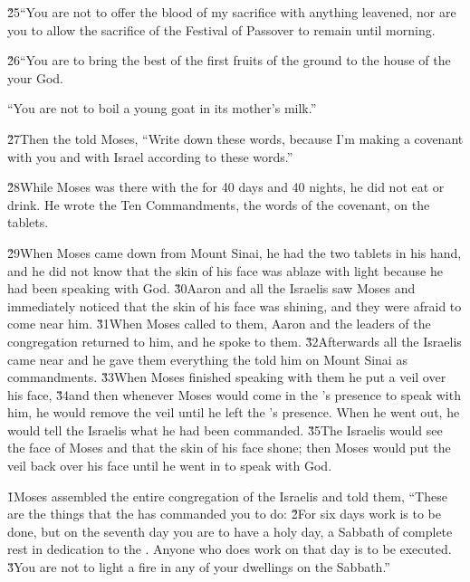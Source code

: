 \v{25}``You are not to offer the blood of my sacrifice with anything leavened, nor are you to allow the sacrifice of the Festival of Passover to remain until morning.

\v{26}``You are to bring the best of the first fruits of the ground to the house of the  your God.

``You are not to boil a young goat in its mother's milk.''

\v{27}Then the  told Moses, ``Write down these words, because I'm making a covenant with you and with Israel according to these words.''

\v{28}While Moses was there with the  for 40 days and 40 nights, he did not eat or drink. He wrote the Ten Commandments, the words of the covenant, on the tablets.

\v{29}When Moses came down from Mount Sinai, he had the two tablets in his hand, and he did not know that the skin of his face was ablaze with light because he had been speaking with God. \v{30}Aaron and all the Israelis saw Moses and immediately noticed that the skin of his face was shining, and they were afraid to come near him. \v{31}When Moses called to them, Aaron and the leaders of the congregation returned to him, and he spoke to them. \v{32}Afterwards all the Israelis came near and he gave them everything the  told him on Mount Sinai as commandments. \v{33}When Moses finished speaking with them he put a veil over his face, \v{34}and then whenever Moses would come in the 's presence to speak with him, he would remove the veil until he left the 's presence. When he went out, he would tell the Israelis what he had been commanded. \v{35}The Israelis would see the face of Moses and that the skin of his face shone; then Moses would put the veil back over his face until he went in to speak with God.

\v{1}Moses assembled the entire congregation of the Israelis and told them, ``These are the things that the  has commanded you to do: \v{2}For six days work is to be done, but on the seventh day you are to have a holy day, a Sabbath of complete rest in dedication to the . Anyone who does work on that day is to be executed. \v{3}You are not to light a fire in any of your dwellings on the Sabbath.''


